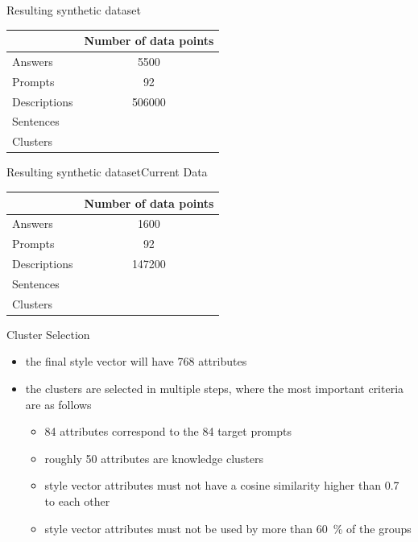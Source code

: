 \documentclass[]{beamer}
\begin{document}
\begin{frame}{Resulting synthetic dataset}
  \begin{tabular}{lS}
    \toprule
                 & {Number of data points} \\ \midrule
    Answers      & 5500                    \\
    Prompts      & 92                      \\
    Descriptions & 506000                  \\
    Sentences    &          \\
    Clusters     &          \\ \bottomrule
  \end{tabular}
\end{frame}
\begin{frame}{Resulting synthetic dataset}{Current Data}
  \begin{tabular}{lS}
    \toprule
                 & {Number of data points} \\ \midrule
    Answers      & 1600                    \\
    Prompts      & 92                      \\
    Descriptions & 147200                  \\
    Sentences    &           \\
    Clusters     &           \\ \bottomrule
  \end{tabular}
\end{frame}

\begin{frame}{Cluster Selection}
  \begin{itemize}
    \item the final style vector will have 768 attributes
    \item the clusters are selected in multiple steps, where the most important criteria are as follows
          \begin{itemize}
            \item \num{84} attributes correspond to the 84 target prompts
            \item roughly \num{50} attributes are knowledge clusters
            \item style vector attributes must not have a cosine similarity higher than \num{0.7} to each other
            \item style vector attributes must not be used by more than \SI{60}{\percent} of the groups
          \end{itemize}
  \end{itemize}
\end{frame}
\end{document}
